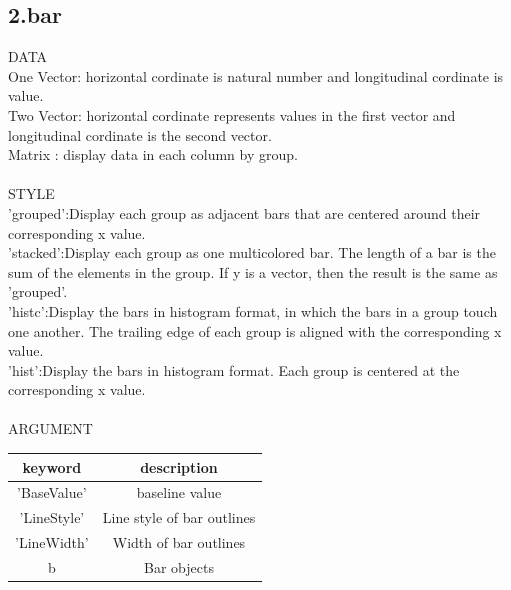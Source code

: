 \documentclass[twoside,a4paper]{article}
\begin{document}
\subsection*{2.bar}
\Large{DATA}\\
One Vector: horizontal cordinate is natural number and longitudinal cordinate is value. \\
Two Vector: horizontal cordinate represents values in the first vector and longitudinal cordinate is the second vector.\\
Matrix : display data in each column by group.\\
\\
\Large{STYLE}\\
'grouped':Display each group as adjacent bars that are centered around their corresponding x value.\\
'stacked':Display each group as one multicolored bar. The length of a bar is the sum of the elements in the group. If y is a vector, then the result is the same as 'grouped'.\\
'histc':Display the bars in histogram format, in which the bars in a group touch one another. The trailing edge of each group is aligned with the corresponding x value.\\
'hist':Display the bars in histogram format. Each group is centered at the corresponding x value.\\
\\
\Large{ARGUMENT}\\

\begin{tabular}{|c|c|}
\hline
keyword & description \\
\hline
'BaseValue' & baseline value\\
'LineStyle' & Line style of bar outlines \\
'LineWidth' & Width of bar outlines\\
b & Bar objects\\
\hline
\end{tabular}
\end{document}
